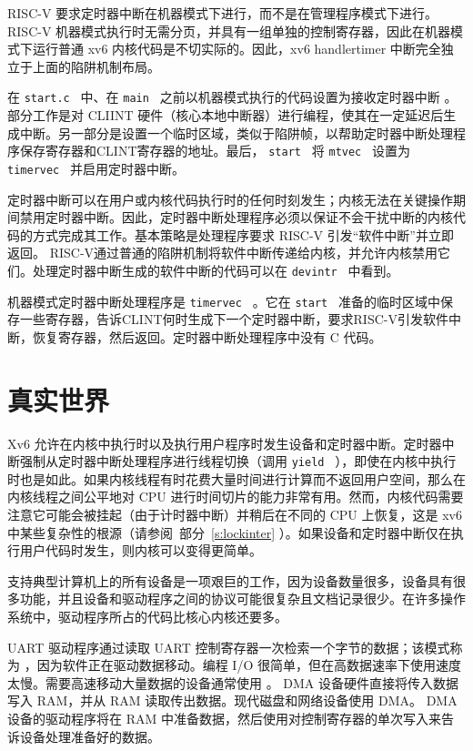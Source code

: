 RISC-V 要求定时器中断在机器模式下进行，而不是在管理程序模式下进行。 RISC-V 机器模式执行时无需分页，并具有一组单独的控制寄存器，因此在机器模式下运行普通 xv6 内核代码是不切实际的。因此，xv6 handlertimer 中断完全独立于上面的陷阱机制布局。  

在  {    \tt    start.c   }  中、在  {    \tt    main   }  之前以机器模式执行的代码设置为接收定时器中断
    。部分工作是对 CLIINT 硬件（核心本地中断器）进行编程，使其在一定延迟后生成中断。另一部分是设置一个临时区域，类似于陷阱帧，以帮助定时器中断处理程序保存寄存器和CLINT寄存器的地址。最后， {    \tt    start   }  将  {    \tt    mtvec   }  设置为  {    \tt    timervec   }  并启用定时器中断。  

定时器中断可以在用户或内核代码执行时的任何时刻发生；内核无法在关键操作期间禁用定时器中断。因此，定时器中断处理程序必须以保证不会干扰中断的内核代码的方式完成其工作。基本策略是处理程序要求 RISC-V 引发“软件中断”并立即返回。 RISC-V通过普通的陷阱机制将软件中断传递给内核，并允许内核禁用它们。处理定时器中断生成的软件中断的代码可以在  {    \tt    devintr   }         中看到。  

机器模式定时器中断处理程序是  {    \tt    timervec   } 
    。它在 {    \tt    start   } 准备的临时区域中保存一些寄存器，告诉CLINT何时生成下一个定时器中断，要求RISC-V引发软件中断，恢复寄存器，然后返回。定时器中断处理程序中没有 C 代码。  

   \section{真实世界  }     

Xv6 允许在内核中执行时以及执行用户程序时发生设备和定时器中断。定时器中断强制从定时器中断处理程序进行线程切换（调用  {    \tt    yield   }  ），即使在内核中执行时也是如此。如果内核线程有时花费大量时间进行计算而不返回用户空间，那么在内核线程之间公平地对 CPU 进行时间切片的能力非常有用。然而，内核代码需要注意它可能会被挂起（由于计时器中断）并稍后在不同的 CPU 上恢复，这是 xv6 中某些复杂性的根源（请参阅~部分~\ref{s:lockinter}    ）。如果设备和定时器中断仅在执行用户代码时发生，则内核可以变得更简单。  

支持典型计算机上的所有设备是一项艰巨的工作，因为设备数量很多，设备具有很多功能，并且设备和驱动程序之间的协议可能很复杂且文档记录很少。在许多操作系统中，驱动程序所占的代码比核心内核还要多。  

UART 驱动程序通过读取 UART 控制寄存器一次检索一个字节的数据；该模式称为        ，因为软件正在驱动数据移动。编程 I/O 很简单，但在高数据速率下使用速度太慢。需要高速移动大量数据的设备通常使用        。 DMA 设备硬件直接将传入数据写入 RAM，并从 RAM 读取传出数据。现代磁盘和网络设备使用 DMA。 DMA 设备的驱动程序将在 RAM 中准备数据，然后使用对控制寄存器的单次写入来告诉设备处理准备好的数据。  

